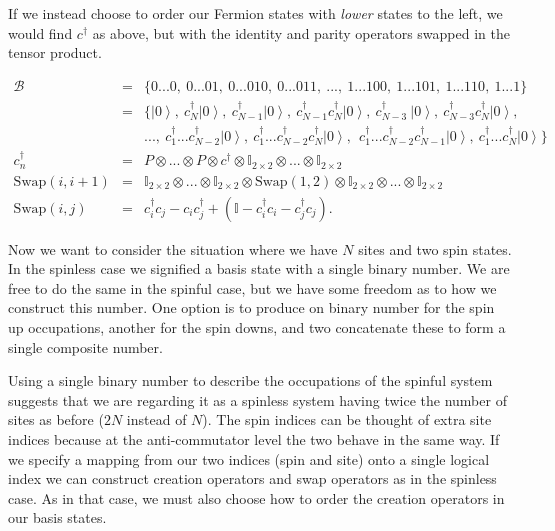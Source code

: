 \documentclass{article}
\newcommand{\ket}[1]{\left| #1 \right>} %
\theoremstyle{definition}
\begin{document}
If we instead choose to order our Fermion states with \emph{lower} states to the left, we would find $c^\dag$ as above, but with the identity and parity operators swapped in the tensor product.

\begin{eqnarray}
\mathcal{B} &=& \{0...0, \ 0...01, \ 0...010, \ 0...011, \ ..., \ 1...100, \ 1...101, \ 1...110, \ 1...1 \} \\
&=& \{\ket{0}, \ c^\dag_N \ket{0}, \ c^\dag_{N-1} \ket{0}, \ c^\dag_{N-1} c^\dag_{N} \ket{0}, \ c^\dag_{N-3}\ \ket{0}, \ c^\dag_{N-3} c^\dag_{N} \ket{0} ,\\
&& ...,\ c^\dag_1...c^\dag_{N-2} \ket{0}, \ c^\dag_1...c^\dag_{N-2} c^\dag_N \ket{0},\ \ c^\dag_1...c^\dag_{N-2} c^\dag_{N-1} \ket{0}, \ c^\dag_1...c^\dag_N \ket{0}\} \nonumber \\
c^\dag_n &=& P\otimes ... \otimes P \otimes c^\dag \otimes \mathbb{I}_{2\times2} \otimes... \otimes \mathbb{I}_{2\times2}\\
\text{Swap}(i,i+1) &=& \mathbb{I}_{2\times2} \otimes ... \otimes \mathbb{I}_{2\times2} \otimes \text{Swap}(1,2) \otimes \mathbb{I}_{2\times2} \otimes ... \otimes \mathbb{I}_{2\times2}\\
\text{Swap}(i,j) &=& c^\dag_i c_j - c_i c^\dag_j + \left(\mathbb{I} - c^\dag_i c_i - c^\dag_j c_j \right).
\end{eqnarray}

Now we want to consider the situation where we have $N$ sites and two spin states. In the spinless case we signified a basis state with a single binary number. We are free to do the same in the spinful case, but we have some freedom as to how we construct this number. One option is to produce on binary number for the spin up occupations, another for the spin downs, and two concatenate these to form a single composite number.

Using a single binary number to describe the occupations of the spinful system suggests that we are regarding it as a spinless system having twice the number of sites as before ($2N$ instead of $N$). The spin indices can be thought of extra site indices because at the anti-commutator level the two behave in the same way. If we specify a mapping from our two indices (spin and site) onto a single logical index we can construct creation operators and swap operators as in the spinless case. As in that case, we must also choose how to order the creation operators in our basis states.
\end{document}
